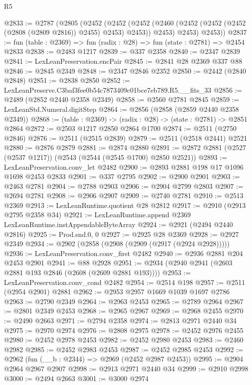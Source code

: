 \begin{lexlean}{R5}
\begin{coremodule}
@2833 := @2787
    (@2805
      (@2452
        (@2452
          (@2452 (@2460 (@2452 (@2452 (@2452 (@2808 (@2809 @2816)) @2455) @2453) @2453)) @2453)
          @2453)
        @2453))
@2837 := fun (table : @2369) => fun (radix : @28) => fun (state : @2781) => @2454 @2833
@2838 := @2483 @1217
@2839 := @337 @2358
@2840 := @2347 @2839
@2841 := LexLeanPreservation.encPair
@2845 := @2841 @28 @2369 @337 @88
@2846 := @2845 @2349
@2848 := @2347 @2846 @2352
@2850 := @2442 (@2840 @2848)
@2851 := @2838 @2850
@2852 := LexLeanPreserve.C3baf3fee0b54c7873409c01bce7eb789.R5.__fits_33
@2856 := @2489 (@2852 @2440 @2358 @2349)
@2858 := @2560 @2781 @2845
@2859 := LexLeanStd.Numeral.digitStep
@2864 := @2856 (@2858 (@2859 @2440 @2358 @2349))
@2868 := (table : @2369) -> (radix : @28) -> (state : @2781) -> @2851 @2864
@2872 := @2503 @1217 @2850 @2864 @1700
@2874 := @2511 (@2750 @2846)
@2876 := @2511 (@2515 @2839)
@2879 := @2511 (@2518 @2441) @2521
@2880 := @2876 @2879
@2881 := @2874 @2880
@2891 := @2872 @2881 (@2527 (@2537 @1217)) (@2543 (@2544 (@2545 @1700) @2850 @2521))
@2893 := LexLeanPreservation.conv_let @2482
@2900 := @2893 @2881 @198 @17 @1096 @1698 @2453 @2833
@2901 := @337 @2795
@2902 := @2900 @2901
@2903 := @2463 @2781
@2904 := @2788 @2903
@2906 := @2904 @2799 @2803
@2907 := @2694 @2781
@2908 := @2906 @2907
@2909 := @2740 @2781
@2910 := @2513 @2369
@2913 := LexLeanRuntime.quotient @28 @2812
@2917 := @2910 (@2913 @2795 @2358 @34)
@2921 := LexLeanRuntime.append @2369 LexLeanRuntime.instAppendableByteArray
@2924 := @2921 (@2494 @2440 @2816)
@2925 := Prod.snd.{0, 0}
@2927 := @2925 @28 @2369
@2928 := @2927 @2349
@2934 := @2902 (@2858 (@2908 (@2909 (@2917 (@2924 @2928)))))
@2936 := LexLeanPreservation.conv_first @2482
@2940 := @2936 @2881 @204 @2453 @2901
@2941 := @88 @2928
@2951 := @2934 (@2940 @2941 (@2603 @2881 @193 @2846 (@2608 (@2609 @2881 @193))))
@2953 := LexLeanPreservation.conv_cond @2482
@2954 := @2514 @198
@2957 := @2511 (@2954 @2901) @2881
@2962 := @2953 @2957 @1669 @1039 @1697 @2786
@2963 := @2790 @2349
@2964 := @2963 @2453
@2965 := @2789 @2964
@2967 := @2801 @2349 @2453
@2968 := @2965 @2967
@2969 := @2968 @2455
@2970 := @2490 @2663
@2971 := @2794 @2358
@2974 := @2813 @2971 @2440 @34
@2975 := @2970 @2974
@2976 := @2808 @2975
@2978 := @2452 @2976 @2455
@2980 := @2452 @2978 @2453
@2982 := @2452 @2980 @2453
@2983 := @2460 @2982
@2985 := @2452 @2983 @2453
@2987 := @2452 @2985 @2453
@2992 := @2962 (fun (__b : @2344) => @2969 (@2452 @2987 @2453))
@2995 := @2904 @2964 @2967 @2907
@2998 := @2913 @2971 @2440 @34
@2999 := @2910 @2998
@3000 := @2494 @2663
@3001 := @3000 @2974

\end{coremodule}
\end{lexlean}

